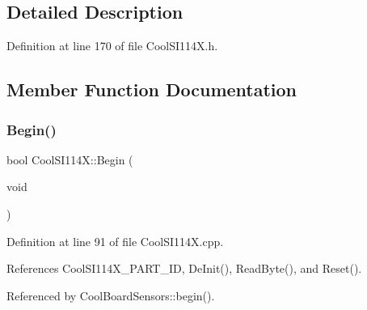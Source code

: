 \subsection{Detailed Description}


Definition at line 170 of file Cool\+S\+I114\+X.\+h.



\subsection{Member Function Documentation}
\mbox{\label{class_cool_s_i114_x_a206b36aca7049f63be1d11088c30a09f}} 
\subsubsection{\texorpdfstring{Begin()}{Begin()}}
{\footnotesize\ttfamily bool Cool\+S\+I114\+X\+::\+Begin (\begin{DoxyParamCaption}\item[{void}]{ }\end{DoxyParamCaption})}



Definition at line 91 of file Cool\+S\+I114\+X.\+cpp.



References Cool\+S\+I114\+X\+\_\+\+P\+A\+R\+T\+\_\+\+ID, De\+Init(), Read\+Byte(), and Reset().



Referenced by Cool\+Board\+Sensors\+::begin().

